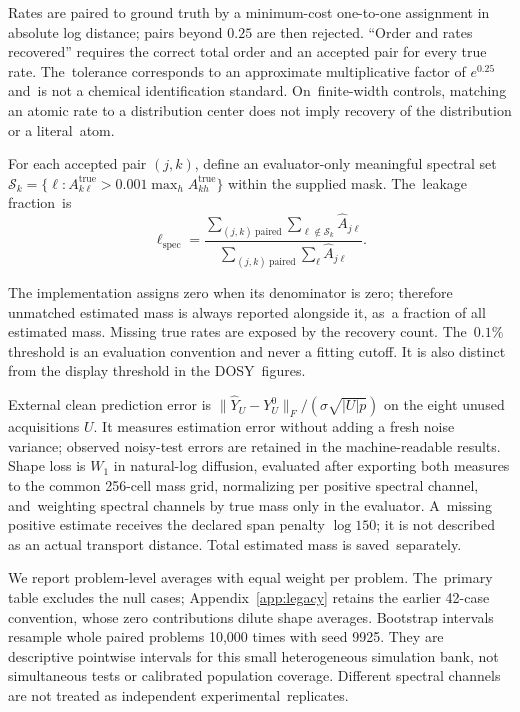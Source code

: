 \documentclass[mathematics,article,accept,moreauthors]{Definitions/mdpi}
\begin{document}
Rates are paired to ground truth by a minimum-cost one-to-one assignment in absolute log distance; pairs beyond $0.25$ are then rejected. ``Order and rates recovered'' requires the correct total order and an accepted pair for every true rate. The~tolerance corresponds to an approximate multiplicative factor of $e^{0.25}$ and~is not a chemical identification standard. On~finite-width controls, matching an atomic rate to a distribution center does not imply recovery of the distribution or a literal~atom.

For each accepted pair $(j,k)$, define an evaluator-only meaningful spectral set\linebreak  
$\mathcal S_k=\{\ell:A^{\mathrm{true}}_{k\ell}>0.001\max_h A^{\mathrm{true}}_{kh}\}$ within the supplied mask. The~leakage \mbox{fraction is}
\begin{equation}\label{eq:leakage}
 \ell_{\mathrm{spec}}=
 \frac{\sum_{(j,k)\ \mathrm{paired}}\sum_{\ell\notin\mathcal S_k}\widehat A_{j\ell}}
 {\sum_{(j,k)\ \mathrm{paired}}\sum_\ell\widehat A_{j\ell}}.
\end{equation}

The implementation assigns zero when its denominator is zero; therefore unmatched estimated mass is always reported alongside it, as~a fraction of all estimated mass. Missing true rates are exposed by the recovery count. The~$0.1\%$ threshold is an evaluation convention and never a fitting cutoff. It is also distinct from the display threshold in the DOSY~figures.

External clean prediction error is $\|\widehat Y_U-Y_U^0\|_F/(\sigma\sqrt{|U|p})$ on the eight unused acquisitions $U$. It measures estimation error without adding a fresh noise variance; observed noisy-test errors are retained in the machine-readable results. Shape loss is $W_1$ in natural-log diffusion, evaluated after exporting both measures to the common 256-cell mass grid, normalizing per positive spectral channel, and~weighting spectral channels by true mass only in the evaluator. A~missing positive estimate receives the declared span penalty $\log150$; it is not described as an actual transport distance. Total estimated mass is saved~separately.

We report problem-level averages with equal weight per problem. The~primary table excludes the null cases; Appendix~\ref{app:legacy} retains the earlier 42-case convention, whose zero contributions dilute shape averages. Bootstrap intervals resample whole paired problems 10,000 times with seed 9925. They are descriptive pointwise intervals for this small heterogeneous simulation bank, not simultaneous tests or calibrated population coverage. Different spectral channels are not treated as independent experimental~replicates.
\end{document}
